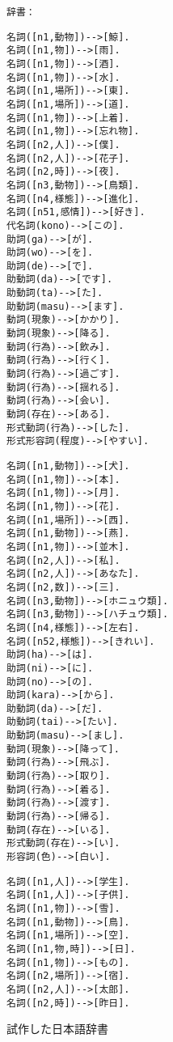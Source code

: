 \begin{figure}[htb]
\footnotesize
\verb|辞書：|\\
\begin{minipage}[t]{.32\textwidth}
\begin{verbatim}
名詞([n1,動物])-->[鯨].
名詞([n1,物])-->[雨].
名詞([n1,物])-->[酒].
名詞([n1,物])-->[水].
名詞([n1,場所])-->[東].
名詞([n1,場所])-->[道].
名詞([n1,物])-->[上着].
名詞([n1,物])-->[忘れ物].
名詞([n2,人])-->[僕].
名詞([n2,人])-->[花子].
名詞([n2,時])-->[夜].
名詞([n3,動物])-->[鳥類].
名詞([n4,様態])-->[進化].
名詞([n51,感情])-->[好き].
代名詞(kono)-->[この].
助詞(ga)-->[が].
助詞(wo)-->[を].
助詞(de)-->[で].
助動詞(da)-->[です].
助動詞(ta)-->[た].
助動詞(masu)-->[ます].
動詞(現象)-->[かかり].
動詞(現象)-->[降る].
動詞(行為)-->[飲み].
動詞(行為)-->[行く].
動詞(行為)-->[過ごす].
動詞(行為)-->[揺れる].
動詞(行為)-->[会い].
動詞(存在)-->[ある].
形式動詞(行為)-->[した].
形式形容詞(程度)-->[やすい].
\end{verbatim}
\end{minipage}
\begin{minipage}[t]{.32\textwidth}
\begin{verbatim}
名詞([n1,動物])-->[犬].
名詞([n1,物])-->[本].
名詞([n1,物])-->[月].
名詞([n1,物])-->[花].
名詞([n1,場所])-->[西].
名詞([n1,動物])-->[燕].
名詞([n1,物])-->[並木].
名詞([n2,人])-->[私].
名詞([n2,人])-->[あなた].
名詞([n2,数])-->[三].
名詞([n3,動物])-->[ホニュウ類].
名詞([n3,動物])-->[ハチュウ類].
名詞([n4,様態])-->[左右].    
名詞([n52,様態])-->[きれい].
助詞(ha)-->[は].
助詞(ni)-->[に].
助詞(no)-->[の].
助詞(kara)-->[から].
助動詞(da)-->[だ].
助動詞(tai)-->[たい]. 
助動詞(masu)-->[まし].
動詞(現象)-->[降って].
動詞(行為)-->[飛ぶ].
動詞(行為)-->[取り].
動詞(行為)-->[着る].
動詞(行為)-->[渡す].
動詞(行為)-->[帰る].  
動詞(存在)-->[いる].
形式動詞(存在)-->[い].
形容詞(色)-->[白い].
\end{verbatim}
\end{minipage}
\begin{minipage}[t]{.32\textwidth}
\begin{verbatim}
名詞([n1,人])-->[学生]. 
名詞([n1,人])-->[子供].
名詞([n1,物])-->[雪].
名詞([n1,動物])-->[鳥]. 
名詞([n1,場所])-->[空].
名詞([n1,物,時])-->[日].
名詞([n1,物])-->[もの]. 
名詞([n2,場所])-->[宿].
名詞([n2,人])-->[太郎].
名詞([n2,時])-->[昨日].
\end{verbatim}
\end{minipage}

\normalsize
\caption{試作した日本語辞書}
\label{fig:dict}
\end{figure}

